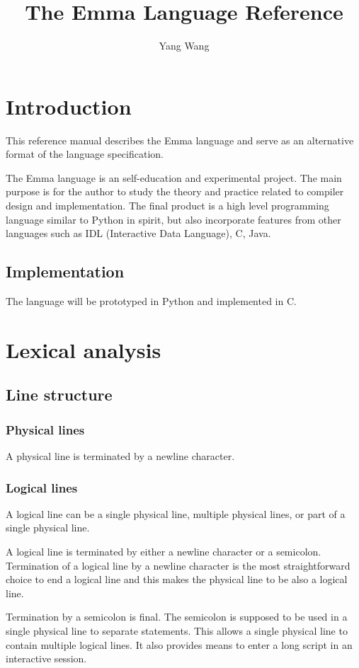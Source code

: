 \documentclass[10pt,a4paper]{article}
\author{Yang Wang}
\title{The Emma Language Reference}
\begin{document}
\section{Introduction}
This reference manual describes the Emma language and serve as an alternative 
format of the language specification.

The Emma language is an self-education and experimental project. 
The main purpose is for the author to study the theory and practice related
to compiler design and implementation. 
The final product is a high level programming language similar to Python in
spirit, but also incorporate features from other languages such as
IDL (Interactive Data Language), C, Java. 

\subsection{Implementation}
The language will be prototyped in Python and implemented in C. 

\section{Lexical analysis}
\subsection{Line structure}


\subsubsection{Physical lines}
A physical line is terminated by a newline character. 

\subsubsection{Logical lines}
A logical line can be a single physical line, multiple physical lines, or
part of a single physical line.

A logical line is terminated by either a newline character or a semicolon.
Termination of a logical line by a newline character is the most 
straightforward choice to end a logical line and this makes the physical 
line to be also a logical line.

Termination by a semicolon is final. The semicolon is supposed to be used
in a single physical line to separate statements. This allows a single 
physical line to contain multiple logical lines. It also provides means
to enter a long script in an interactive session.
\end{document}
